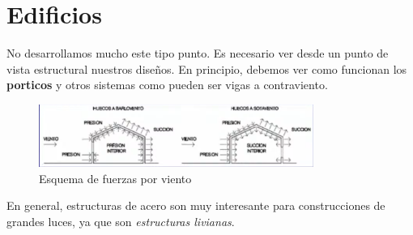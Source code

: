 \documentclass[../main.tex]{subfiles}
\begin{document}
\section{Edificios}

No desarrollamos mucho este tipo punto. Es necesario ver desde un punto de vista
estructural nuestros diseños. En principio, debemos ver como funcionan los \textbf{porticos}
y otros sistemas como pueden ser vigas a contraviento.

\begin{figure}[ht]
  \centering
  \includegraphics[width=0.8\textwidth]{../images/20210329/viento}
  \caption{Esquema de fuerzas por viento}
  \label{fig:viento}
\end{figure}

En general, estructuras de acero son muy interesante para construcciones de grandes
luces, ya que son \textit{estructuras livianas}. 
\end{document}
